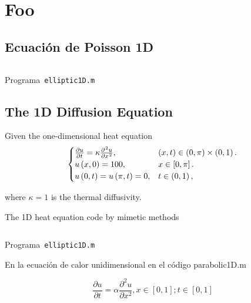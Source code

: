 \documentclass[a4paper,abstract=true]{scrreprt}
\begin{document}
\chapter{Foo}

\section{Ecuación de Poisson 1D}

\begin{listing}[ht!]
    \tiny
    \centering
    \inputminted[frame=single,framesep=10pt,linenos,firstline=1,lastline=53,highlightlines={21,29}]{octave}{../examples/octave/elliptic1D.m}
    \caption{Programa~\texttt{elliptic1D.m}}
    \label{code:elliptic1D.m}
\end{listing}

\section{The 1D Diffusion Equation}

Given the one-dimensional heat equation
\begin{equation}\label{eq:IBVPheat1d}
    \begin{cases}
        \diffp{u}{t}=
        \kappa\diffp[2]{u}{x},
         & \left(x,t\right)\in
        \left(0,\pi\right)\times\left(0,1\right). \\
        u\left(x,0\right)=
        100,
         & x\in
        \left[0,\pi\right].                       \\
        u\left(0,t\right)=
        u\left(\pi,t\right)=0,
         & t\in
        \left(0,1\right),
    \end{cases}
\end{equation}

where $\kappa=1$ is the thermal diffusivity.

The 1D heat equation code by mimetic methods

\begin{listing}[ht!]
    \tiny
    \centering
    \inputminted[frame=single,framesep=10pt,linenos,firstline=1,lastline=53,highlightlines={21,29}]{octave}{../examples/octave/parabolic1D.m}
    \caption{Programa~\texttt{elliptic1D.m}}
    \label{code:parabolic1D.m}
\end{listing}


En  la ecuación de calor unidimensional en el código parabolic1D.m

\begin{equation}
	\frac{\partial u}{\partial t} = \alpha \frac{\partial^{2} u}{\partial x^{2}},   x \in [0,1] ; t \in [0,1]
\end{equation}
\end{document}
